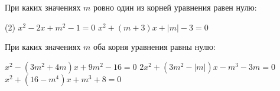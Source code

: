 \begin{consultation}
	\begin{listofex}
		\item При каких значениях \(m\) ровно один из корней уравнения равен нулю:
		\begin{tasks}(2)
			\task \( x^2-2x+m^2-1=0 \)
			\task \( x^2+(m+3)x+|m|-3=0 \)
		\end{tasks}
		\item При каких значениях \(m\) оба корня уравнения равны нулю:
		\begin{tasks}
			\task \( x^2-(3m^2+4m)x+9m^2-16=0 \)
			\task \( 2x^2+(3m^2-|m|)x-m^3-3m=0 \)
			\task \( x^2+(16-m^4)x+m^3+8=0 \)
		\end{tasks}
		
	\end{listofex}
\end{consultation}

